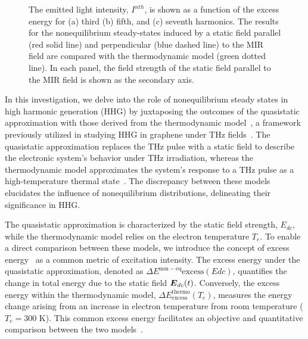 \begin{figure}[ht]
\caption{\label{fig:intensity_tem}
The emitted light intensity, $I^{\textit{n}th}$, is shown as a function of the excess energy for (a) third (b) fifth, and (c) seventh harmonics. The results for the nonequilibrium steady-states induced by a static field parallel (red solid line) and perpendicular (blue dashed line) to the MIR field are compared with the thermodynamic model (green dotted line). In each panel, the field strength of the static field parallel to the MIR field is shown as the secondary axis.
}
\end{figure}

In this investigation, we delve into the role of nonequilibrium steady states in high harmonic generation (HHG) by juxtaposing the outcomes of the quasistatic approximation with those derived from the thermodynamic model~\cite{mics2015thermodynamic}, a framework previously utilized in studying HHG in graphene under THz fields~\cite{Hafez2018,doi:10.1126/sciadv.abf9809}. The quasistatic approximation replaces the THz pulse with a static field to describe the electronic system's behavior under THz irradiation, whereas the thermodynamic model approximates the system's response to a THz pulse as a high-temperature thermal state~\cite{mics2015thermodynamic}. The discrepancy between these models elucidates the influence of nonequilibrium distributions, delineating their significance in HHG.

The quasistatic approximation is characterized by the static field strength, $E_{dc}$, while the thermodynamic model relies on the electron temperature $T_e$. To enable a direct comparison between these models, we introduce the concept of excess energy~\cite{PhysRevB.106.024313} as a common metric of excitation intensity. The excess energy under the quasistatic approximation, denoted as $\Delta E^{\mathrm{non-eq}}{\textrm{excess}}(E{dc})$, quantifies the change in total energy due to the static field $\boldsymbol E_{dc}(t)$. Conversely, the excess energy within the thermodynamic model, $\Delta E^{\textrm{thermo}}_{\textrm{excess}}(T_e)$, measures the energy change arising from an increase in electron temperature from room temperature ($T_e=300$ K). This common excess energy facilitates an objective and quantitative comparison between the two models~\cite{PhysRevB.106.024313}.

